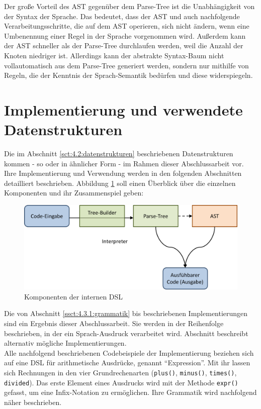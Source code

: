 Der große Vorteil des AST gegenüber dem Parse-Tree ist die Unabhängigkeit von der Syntax der Sprache. Das bedeutet, dass der AST und auch  nachfolgende Verarbeitungsschritte, die auf dem AST operieren, sich nicht ändern, wenn eine Umbenennung einer Regel in der Sprache vorgenommen wird. Außerdem kann der AST schneller als der Parse-Tree durchlaufen werden, weil die Anzahl der Knoten niedriger ist. Allerdings kann der abstrakte Syntax-Baum nicht vollautomatisch aus dem Parse-Tree generiert werden, sondern nur mithilfe von Regeln, die der Kenntnis der Sprach-Semantik bedürfen und diese widerspiegeln.

\section{Implementierung und verwendete Datenstrukturen}\label{ssct:4.3:implementierung}
Die im Abschnitt \ref{sct:4.2:datenstrukturen} beschriebenen Datenstrukturen kommen - so oder in ähnlicher Form - im Rahmen dieser Abschlussarbeit vor. Ihre Implementierung und Verwendung werden in den folgenden Abschnitten detailliert beschrieben. Abbildung \ref{fig:komponenten} soll einen Überblick über die einzelnen Komponenten und ihr Zusammenspiel geben:

\begin{figure}[H]
\centering\includegraphics[width=.8\textwidth]{images/kapitel4/komponenten.png}
\caption{Komponenten der internen DSL}
\label{fig:komponenten}
\end{figure}

Die von Abschnitt \ref{ssct:4.3.1:grammatik} bis  beschriebenen Implementierungen sind ein Ergebnis dieser Abschlussarbeit. Sie werden in der Reihenfolge beschrieben, in der ein Sprach-Ausdruck verarbeitet wird. Abschnitt  beschreibt alternativ mögliche Implementierungen.\\
Alle nachfolgend beschriebenen Codebeispiele der Implementierung beziehen sich auf eine DSL für arithmetische Ausdrücke, genannt \textquotedblleft Expression\textquotedblright. Mit ihr lassen sich Rechnungen in den vier Grundrechenarten (\texttt{plus()}, \texttt{minus()}, \texttt{times()}, \texttt{divided}). Das erste Element eines Ausdrucks wird mit der Methode \texttt{expr()} gefasst, um eine Infix-Notation zu ermöglichen. Ihre Grammatik wird nachfolgend näher beschrieben.

